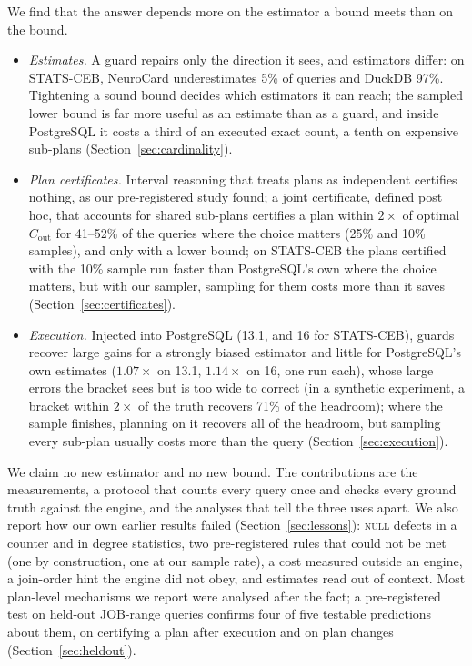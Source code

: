\documentclass[sigconf, nonacm]{acmart}
\begin{document}
We find that the answer depends more on the estimator a bound meets than on the bound.
\begin{itemize}
\item \emph{Estimates.} A guard repairs only the direction it sees, and
estimators differ: on STATS-CEB, NeuroCard underestimates 5\% of queries and
DuckDB 97\%. Tightening a sound bound decides which estimators it can reach; the sampled lower bound
is far more useful as an estimate than as a guard, and inside PostgreSQL it
costs a third of an executed exact count, a tenth on expensive sub-plans
(Section~\ref{sec:cardinality}).
\item \emph{Plan certificates.} Interval reasoning that treats plans as
independent certifies nothing, as our pre-registered study found; a joint
certificate, defined post hoc, that accounts for shared sub-plans certifies a
plan within $2\times$ of optimal $C_{\mathrm{out}}$ for 41--52\% of the
queries where the choice matters (25\% and 10\% samples), and only with a
lower bound; on STATS-CEB the plans certified with the 10\% sample run faster
than PostgreSQL's own where the choice matters, but with our sampler, sampling
for them costs more than it saves
(Section~\ref{sec:certificates}).
\item \emph{Execution.} Injected into PostgreSQL (13.1, and 16 for STATS-CEB),
guards recover large gains for
a strongly biased estimator and little for PostgreSQL's own estimates
($1.07\times$ on 13.1, $1.14\times$ on 16, one run each), whose
large errors the bracket sees but is too wide to correct (in a synthetic
experiment, a bracket within $2\times$ of the truth recovers 71\% of the
headroom); where the sample
finishes, planning on it recovers all of the headroom, but sampling
every sub-plan usually costs more than the query (Section~\ref{sec:execution}).
\end{itemize}
We claim no new estimator and no new bound. The contributions are the
measurements, a protocol that counts every query once and checks every ground
truth against the engine, and the analyses that tell the three uses apart. We
also report how our own earlier results failed (Section~\ref{sec:lessons}):
\textsc{null} defects in a counter and in degree statistics, two pre-registered
rules that could not be met (one by construction, one at our sample rate), a cost measured outside an engine, a join-order hint the engine did not
obey, and estimates read out of context. Most plan-level mechanisms we report
were analysed after the fact; a pre-registered test on held-out JOB-range
queries confirms four of five testable predictions about them, on certifying a
plan after execution and on plan changes (Section~\ref{sec:heldout}).
\end{document}
